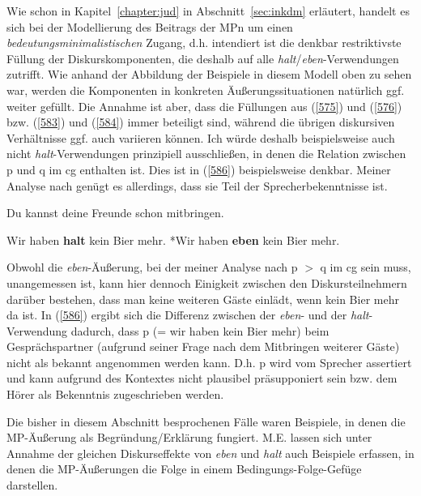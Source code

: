 Wie schon in Kapitel~\ref{chapter:jud} in Abschnitt~\ref{sec:inkdm} erläutert, handelt es sich bei der Mo\-dellierung des Beitrags der MPn um einen \textit{bedeutungsminimalistischen}  Zugang, d.h. intendiert ist die denkbar restriktivste Füllung der Diskurskomponenten, die des\-halb auf alle \textit{halt}/\textit{eben}-Verwendungen zutrifft. Wie anhand der Abbildung der Beispiele in diesem Modell oben zu sehen war, werden die Komponenten in konkreten Äußerungssituationen natürlich ggf. weiter gefüllt. Die Annahme ist aber, dass die Füllungen aus (\ref{575}) und (\ref{576}) bzw. (\ref{583}) und (\ref{584}) immer beteiligt sind, während die übrigen diskursiven Verhältnisse ggf. auch variieren können. Ich würde deshalb beispielsweise auch nicht \textit{halt}-Verwendungen prinzipiell aus\-schließen, in denen die Relation zwischen p und q im cg enthalten ist. Dies ist in (\ref{586}) beispielsweise denkbar. Meiner Analyse nach genügt es allerdings, dass sie Teil der Sprecherbekenntnisse ist.	

\begin{exe}
	\ex\label{586} Du kannst deine Freunde schon mitbringen.
		\begin{xlist}	
			\ex\label{586a} Wir haben \textbf{halt} kein Bier mehr.
			\ex\label{586b} *Wir haben \textbf{eben} kein Bier mehr. 
		\end{xlist}
\end{exe}
Obwohl die \textit{eben}-Äußerung, bei der meiner Analyse nach p $>$ q im cg sein muss, unangemessen ist, kann hier dennoch Einigkeit zwischen den Diskursteilnehmern darüber bestehen, dass man keine weiteren Gäste einlädt, wenn kein Bier mehr da ist. In (\ref{586}) ergibt sich die Differenz zwischen der \textit{eben}- und der \textit{halt}-Verwendung dadurch, dass p (= wir haben kein Bier mehr) beim Gesprächspartner (aufgrund seiner Frage nach dem Mitbringen weiterer Gäste) nicht als bekannt angenommen werden kann. D.h. p wird vom Sprecher assertiert  und kann aufgrund des Kontextes nicht plausibel präsupponiert  sein bzw. dem Hörer als Bekenntnis zugeschrieben werden.

Die bisher in diesem Abschnitt besprochenen Fälle waren Beispiele, in denen die MP-Äußerung als Begründung/Erklärung fungiert. M.E. lassen sich unter Annahme der gleichen Diskurseffekte von \textit{eben} und \textit{halt} auch Beispiele erfassen, in denen die MP-Äußerungen die Folge in einem Bedingungs-Folge-Gefüge  darstellen.

